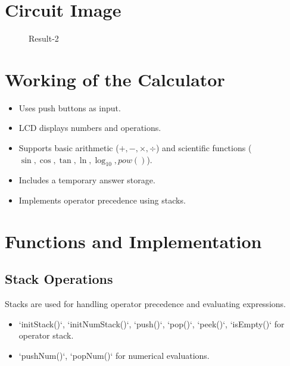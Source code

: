 \documentclass{article}
\begin{document}
\section{Circuit Image}
\begin{figure}[h!]
	\centering
	\caption{Result-2}
\end{figure}

\section{Working of the Calculator}
\begin{itemize}
\item Uses push buttons as input.
\item LCD displays numbers and operations.
\item Supports basic arithmetic ($+, -, \times, \div$) and scientific functions ($\sin, \cos, \tan, \ln, \log_{10}, pow()$).
\item Includes a temporary answer storage.
\item Implements operator precedence using stacks.
\end{itemize}

\section{Functions and Implementation}
\subsection{Stack Operations}
Stacks are used for handling operator precedence and evaluating expressions.
\begin{itemize}
    \item `initStack()`, `initNumStack()`, `push()`, `pop()`, `peek()`, `isEmpty()` for operator stack.
    \item `pushNum()`, `popNum()` for numerical evaluations.
\end{itemize}
\end{document}
